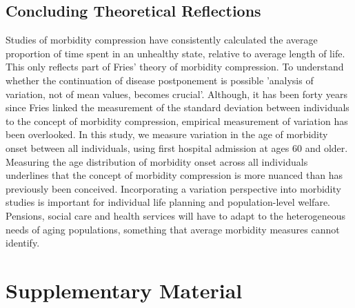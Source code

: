 \subsection{Concluding Theoretical Reflections}
Studies of morbidity compression have consistently calculated the average proportion 
of time spent in an unhealthy state, relative to average length of life.\citep{beltran2015past,
salomon2012healthy,crimmins2016trends,colvez1983potential,robine1999health,
murray2012disability} This only reflects part of Fries' theory of morbidity 
compression. To understand whether the continuation of disease postponement 
is possible 'analysis of variation, not of mean values, becomes crucial'.\citep{fries1980aging} 
Although, it has been forty years since Fries linked the measurement of the 
standard deviation between individuals to the concept of morbidity compression, 
empirical measurement of variation has been overlooked. In this study, we measure 
variation in the age of morbidity onset between all individuals, using first 
hospital admission at ages 60 and older. Measuring the age distribution of 
morbidity onset across all individuals underlines that the concept of morbidity 
compression is more nuanced than has previously been conceived. Incorporating a 
variation perspective into morbidity studies is important for individual life 
planning and population-level welfare. Pensions, social care and health services 
will have to adapt to the heterogeneous needs of aging populations, something 
that average morbidity measures cannot identify.\\




\newpage


\section{Supplementary Material}

\vspace{0.25in}


